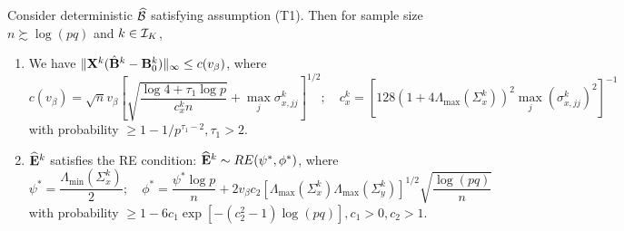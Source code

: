 \documentclass[fleqn,11pt]{article}
\numberwithin{equation}{section}
\begin{document}

\begin{Proposition}\label{prop:ErrorRE}
Consider deterministic $\widehat {{\cal{B}}}$ satisfying assumption (T1). Then for sample size $n \succsim \log (pq)$ and $k \in {\cal{I}}_K$,

\begin{enumerate}
\item We have $\| {\mathbf{X}}^k ( \hat {{\mathbf{B}}}^k - {\mathbf{B}}_0^k ) \|_\infty \leq c( v_\beta)$, where
%
$$
c(v_\beta) =\sqrt n v_\beta \left[ \sqrt{ \frac{ \log 4 + \tau_1 \log p}{c_x^k n}} + \max_j \sigma_{x,jj}^k \right]^{1/2}; \quad
c_x^k = \left[ 128 ( 1 + 4 \Lambda_{\max} (\Sigma_x^k)  )^2 \max_j (\sigma_{x,jj}^k)^2 \right]^{-1}
$$
%
with probability $ \geq 1 - 1/p^{\tau_1-2}, \tau_1 > 2$.
%
\item $\widehat {{\mathbf{E}}}^k$ satisfies the RE condition: $ \widehat {{\mathbf{E}}}^k \sim RE (\psi^*, \phi^*)$, where 
%
$$
\psi^* = \frac{ \Lambda_{\min} (\Sigma_x^k)}{2}; \quad \phi^* = \frac{ \psi^* \log p}{n} + 2 v_\beta c_2 [ \Lambda_{\max} (\Sigma_x^k) \Lambda_{\max} (\Sigma_y^k) ]^{1/2} \sqrt{\frac{ \log(pq)}{n}}
$$
%
with probability $\geq 1 - 6c_1 \exp [-(c_2^2-1) \log(pq)], c_1 > 0, c_2 > 1$.
\end{enumerate} 
\end{Proposition}
\end{document}
